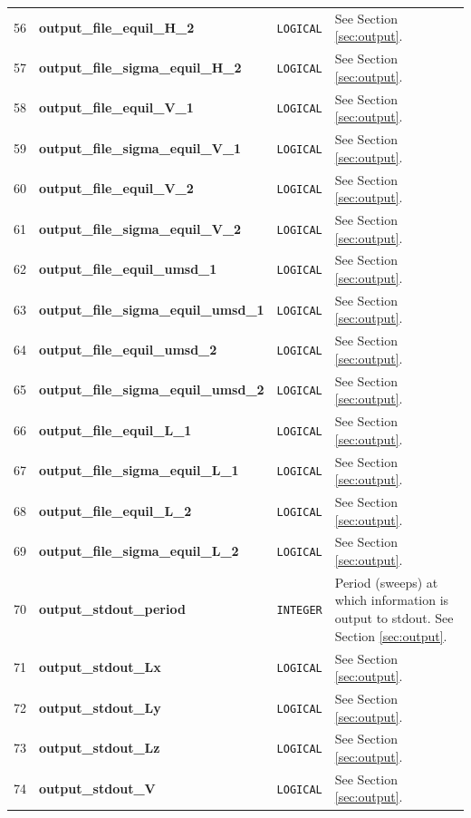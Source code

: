 \documentclass{report}
\begin{document}
\begin{landscape}
\begin{center}
\begin{longtable}{l l l p{8cm}}
56 & \textbf{output\_file\_equil\_H\_2}  &  \texttt{LOGICAL}  & See Section \ref{sec:output}. \\
57 & \textbf{output\_file\_sigma\_equil\_H\_2}  &  \texttt{LOGICAL}  & See Section \ref{sec:output}. \\
58 & \textbf{output\_file\_equil\_V\_1}  &  \texttt{LOGICAL}  & See Section \ref{sec:output}. \\
59 & \textbf{output\_file\_sigma\_equil\_V\_1}  &  \texttt{LOGICAL}  & See Section \ref{sec:output}. \\
60 & \textbf{output\_file\_equil\_V\_2}  &  \texttt{LOGICAL}  & See Section \ref{sec:output}. \\
61 & \textbf{output\_file\_sigma\_equil\_V\_2}  &  \texttt{LOGICAL}  & See Section \ref{sec:output}. \\
62 & \textbf{output\_file\_equil\_umsd\_1}  &  \texttt{LOGICAL}  & See Section \ref{sec:output}. \\
63 & \textbf{output\_file\_sigma\_equil\_umsd\_1}  &  \texttt{LOGICAL}  & See Section \ref{sec:output}. \\
64 & \textbf{output\_file\_equil\_umsd\_2}  &  \texttt{LOGICAL}  & See Section \ref{sec:output}. \\
65 & \textbf{output\_file\_sigma\_equil\_umsd\_2}  &  \texttt{LOGICAL}  & See Section \ref{sec:output}. \\
66 & \textbf{output\_file\_equil\_L\_1} &  \texttt{LOGICAL}  & See Section \ref{sec:output}. \\
67 & \textbf{output\_file\_sigma\_equil\_L\_1} &  \texttt{LOGICAL}  & See Section \ref{sec:output}. \\
68 & \textbf{output\_file\_equil\_L\_2} &  \texttt{LOGICAL}  & See Section \ref{sec:output}. \\
69 & \textbf{output\_file\_sigma\_equil\_L\_2} &  \texttt{LOGICAL}  & See Section \ref{sec:output}. \\
70 & \textbf{output\_stdout\_period}  &  \texttt{INTEGER}  & Period (sweeps) at which information is output to stdout. See Section \ref{sec:output}. \\
71 & \textbf{output\_stdout\_Lx}  &  \texttt{LOGICAL}  & See Section \ref{sec:output}. \\
72 & \textbf{output\_stdout\_Ly}  &  \texttt{LOGICAL}  & See Section \ref{sec:output}. \\
73 & \textbf{output\_stdout\_Lz}  &  \texttt{LOGICAL}  & See Section \ref{sec:output}. \\
74 & \textbf{output\_stdout\_V}  &  \texttt{LOGICAL}  & See Section \ref{sec:output}. \\

\end{longtable}
\end{center}
\end{landscape}
\end{document}
